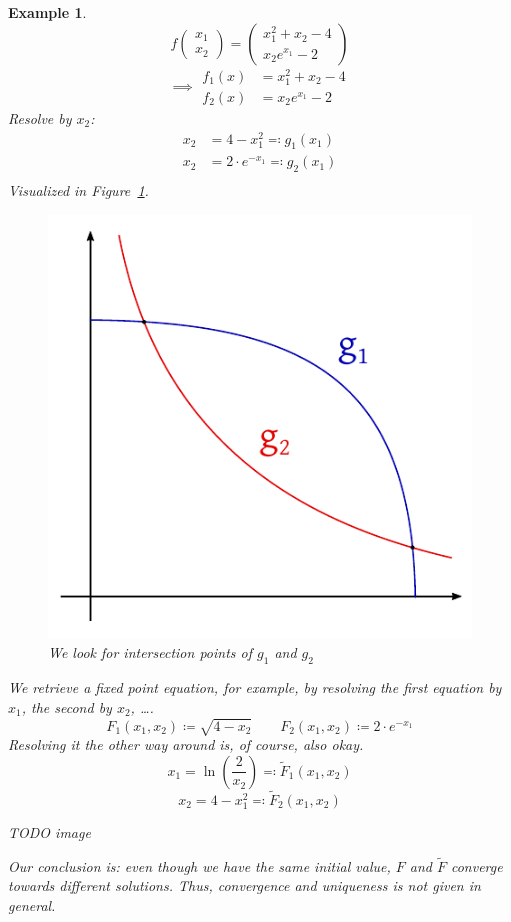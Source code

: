 \documentclass[a4paper]{article}
\newcounter{lecref}[section]
\numberwithin{lecref}{section}
\theoremstyle{break}
\newtheorem{example}[lecref]{Example}
\begin{document}
\begin{example}
  \label{ex:6-1}
  \[ f\begin{pmatrix} x_1 \\ x_2 \end{pmatrix} = \begin{pmatrix} x_1^2 + x_2 - 4 \\ x_2 e^{x_1} - 2 \end{pmatrix} \]
  \[
    \implies \begin{array}{cc}
      f_1(x) &= x_1^2 + x_2 - 4 \\
      f_2(x) &= x_2 e^{x_1} - 2
    \end{array}
  \]
  Resolve by $x_2$:
  \begin{align*}
    x_2 &= 4 - x_1^2 \eqqcolon g_1(x_1) \\
    x_2 &= 2 \cdot e^{-x_1} \eqqcolon g_2(x_1) \\
  \end{align*}
  Visualized in Figure~\ref{img:intersection}.
  
  \begin{figure}[!ht]
    \begin{center}
      \includegraphics{img/intersection.pdf}
      \caption{We look for intersection points of $g_1$ and $g_2$}
      \label{img:intersection}
    \end{center}
  \end{figure}

  We retrieve a fixed point equation, for example, by resolving the first equation by $x_1$, the second by $x_2$, \dots.
  \[ F_1(x_1, x_2) \coloneqq \sqrt{4 - x_2} \qquad F_2(x_1, x_2) \coloneqq 2 \cdot e^{-x_1} \]
  Resolving it the other way around is, of course, also okay.
  \[ x_1 = \ln(\frac2{x_2}) \eqqcolon \tilde F_1(x_1, x_2) \]
  \[ x_2 = 4 - x_1^2 \eqqcolon \tilde F_2(x_1, x_2) \]

  TODO image

  Our conclusion is: even though we have the same initial value, $F$ and $\tilde F$ converge towards different solutions.
  Thus, convergence and uniqueness is not given in general.
\end{example}
\end{document}
